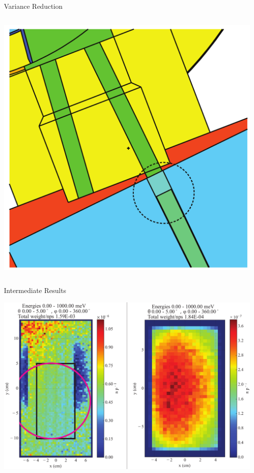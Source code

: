 \documentclass[final,t]{beamer}
\begin{document}
\begin{frame}{}
\begin{columns}[t]
\begin{column}{.3\linewidth}
\begin{block}{Variance Reduction}
\begin{columns}
\begin{column}{0.5\linewidth}
      \begin{center}
      \includegraphics*[width=.85\linewidth]{crystal.pdf}
      \end{center}
      
      \end{column}

      \end{columns}

      \end{block}

      \begin{block}{Intermediate Results}

     \includegraphics*[width=\linewidth]{dists.pdf}


\end{block}
\end{column}
\end{columns}
\end{frame}
\end{document}
